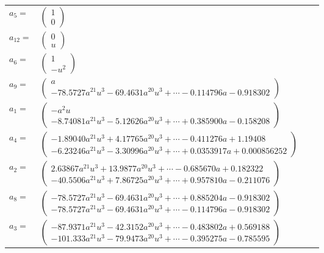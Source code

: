 \documentclass[1p]{elsarticle_modified}
\theoremstyle{definition}
\begin{document}
\begin{tabular}{m{7pt} m{180pt} m{7pt} m{180pt} }
\flushright $a_{5}=$&$\begin{pmatrix}1\\0\end{pmatrix}$ \\
\flushright $a_{12}=$&$\begin{pmatrix}0\\u\end{pmatrix}$ \\
\flushright $a_{6}=$&$\begin{pmatrix}1\\- u^2\end{pmatrix}$ \\
\flushright $a_{9}=$&$\begin{pmatrix}a\\-78.5727 a^{21} u^{3}-69.4631 a^{20} u^{3}+\cdots-0.114796 a-0.918302\end{pmatrix}$ \\
\flushright $a_{1}=$&$\begin{pmatrix}- a^2 u\\-8.74081 a^{21} u^{3}-5.12626 a^{20} u^{3}+\cdots+0.385900 a-0.158208\end{pmatrix}$ \\
\flushright $a_{4}=$&$\begin{pmatrix}-1.89040 a^{21} u^{3}+4.17765 a^{20} u^{3}+\cdots-0.411276 a+1.19408\\-6.23246 a^{21} u^{3}-3.30996 a^{20} u^{3}+\cdots+0.0353917 a+0.000856252\end{pmatrix}$ \\
\flushright $a_{2}=$&$\begin{pmatrix}2.63867 a^{21} u^{3}+13.9877 a^{20} u^{3}+\cdots-0.685670 a+0.182322\\-40.5506 a^{21} u^{3}+7.86725 a^{20} u^{3}+\cdots+0.957810 a-0.211076\end{pmatrix}$ \\
\flushright $a_{8}=$&$\begin{pmatrix}-78.5727 a^{21} u^{3}-69.4631 a^{20} u^{3}+\cdots+0.885204 a-0.918302\\-78.5727 a^{21} u^{3}-69.4631 a^{20} u^{3}+\cdots-0.114796 a-0.918302\end{pmatrix}$ \\
\flushright $a_{3}=$&$\begin{pmatrix}-87.9371 a^{21} u^{3}-42.3152 a^{20} u^{3}+\cdots-0.483802 a+0.569188\\-101.333 a^{21} u^{3}-79.9473 a^{20} u^{3}+\cdots-0.395275 a-0.785595\end{pmatrix}$ \\

\end{tabular}
\end{document}
